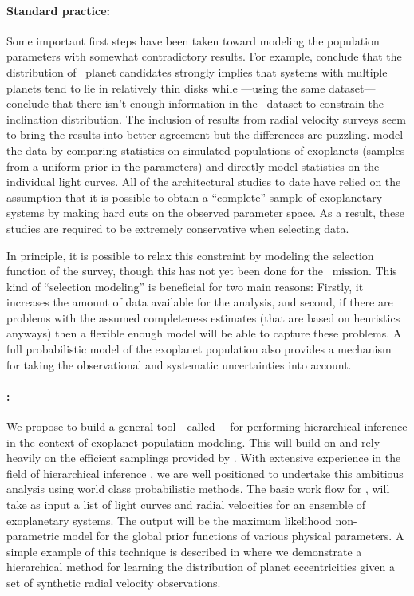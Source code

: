 \documentclass[letterpaper,12pt,preprint]{hack_aastex}
\newcommand{\Bart}{\package{Bart}}
\newcommand{\TheCreator}{\package{TheCreator}}
\begin{document}
\paragraph{Standard practice:}
Some important first steps have been taken toward modeling the population
parameters \citep[for example,][]{lissauer,tremaine,fang} with somewhat
contradictory results.
For example, \citet{fang} conclude that the distribution of \Kepler\ planet
candidates strongly implies that systems with multiple planets tend to lie in
relatively thin disks while \citet{tremaine}---using the same
dataset---conclude that there isn't enough information in the \Kepler\ dataset
to constrain the inclination distribution.
The inclusion of results from radial velocity surveys seem to bring the
results into better agreement but the differences are
puzzling.
\citet{fang} model
the data by comparing statistics on simulated populations of exoplanets
 (samples from a uniform prior in the parameters) and \citet{tremaine}
directly model statistics on the individual light curves.
All of the architectural studies to date have relied on the assumption that it
is possible to obtain a ``complete'' sample of exoplanetary systems by making
hard cuts on the observed parameter space.
As a result, these studies are required to be extremely conservative when
selecting data.

In principle, it is possible to relax this constraint by modeling the selection function of
the survey, though this has not yet been done for the \Kepler\ mission.
This kind of ``selection modeling'' is beneficial for two main reasons: Firstly, it increases the amount of data
available for the analysis, and second, if there are problems with the assumed
completeness estimates (that are based on heuristics anyways) then a flexible
enough model will be able to capture these problems.
A full probabilistic model of the exoplanet population also provides a
mechanism for taking the observational and systematic uncertainties into
account.


\paragraph{\TheCreator:}
We propose to build a general tool---called \TheCreator---for performing
hierarchical inference in the context of exoplanet population modeling.
This will build on and rely heavily on the efficient samplings provided by
\Bart.
With extensive experience in the field of hierarchical inference
\citep{xd,hogg-ecc,stargal}, we are well positioned to undertake this
ambitious analysis using world class probabilistic methods.
The basic work flow for \TheCreator, will take as input a list of light
curves and radial velocities for an ensemble of exoplanetary systems.
The output will be the maximum likelihood non-parametric model for the global
prior functions of various physical parameters.
A simple example of this technique is described in \citet{hogg-ecc} where we
demonstrate a hierarchical method for learning the distribution of planet
eccentricities given a set of synthetic radial velocity observations.
\end{document}
